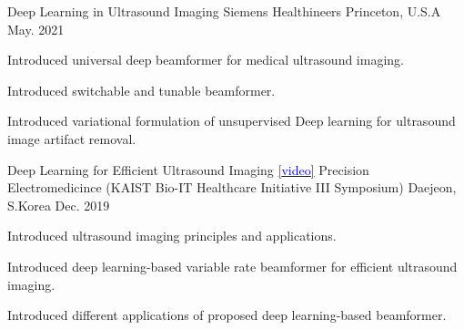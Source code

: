 

\begin{cventries}

  \cventry
    {Deep Learning in Ultrasound Imaging} %
    {Siemens Healthineers} %
    {Princeton, U.S.A} %
    {May. 2021} %
    {
      \begin{cvitems} %
        \item {Introduced universal deep beamformer for medical ultrasound imaging.}
        \item {Introduced switchable and tunable beamformer.}
        \item {Introduced variational formulation of unsupervised Deep learning for ultrasound image artifact removal.}
      \end{cvitems}
    }
    
  \cventry
    {Deep Learning for Efficient Ultrasound Imaging \href{https://youtu.be/Pu3FXwctqGc}{[\textcolor{blue}{video}]}} %
    {Precision Electromedicince (KAIST Bio-IT Healthcare Initiative III Symposium)} %
    {Daejeon, S.Korea} %
    {Dec. 2019} %
    {
      \begin{cvitems} %
        \item {Introduced ultrasound imaging principles and applications.}
        \item {Introduced deep learning-based variable rate beamformer for efficient ultrasound imaging.}
        \item {Introduced different applications of proposed deep learning-based beamformer.}
      \end{cvitems}
    }


\end{cventries}
